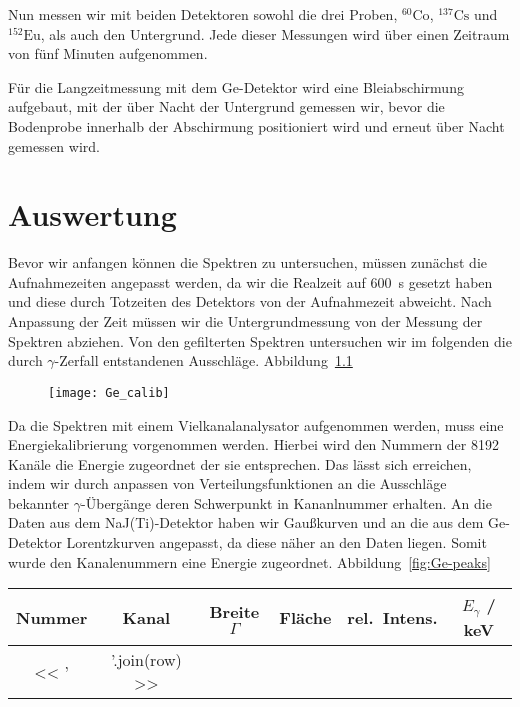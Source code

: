 \documentclass[11pt, ngerman, fleqn, DIV=15, headinclude, BCOR=2cm]{scrreprt}
\newcommand{\plotwidth}{0.8\linewidth}
\begin{document}
Nun messen wir mit beiden Detektoren sowohl die drei Proben, $^{60}\text{Co}$,
$^{137}\text{Cs}$ und $^{152}\text{Eu}$, als auch den Untergrund. Jede dieser
Messungen wird über einen Zeitraum von fünf Minuten aufgenommen.

Für die Langzeitmessung mit dem Ge-Detektor wird eine Bleiabschirmung
aufgebaut, mit der über Nacht der Untergrund gemessen wir, bevor die Bodenprobe
innerhalb der Abschirmung positioniert wird und erneut über Nacht gemessen wird.

\chapter{Auswertung}

Bevor wir anfangen können die Spektren zu untersuchen, müssen zunächst die
Aufnahmezeiten angepasst werden, da wir die Realzeit auf \SI{600}{\second} gesetzt
haben und diese durch Totzeiten des Detektors von der Aufnahmezeit abweicht.
Nach Anpassung der Zeit müssen wir die
Untergrundmessung von der Messung der Spektren abziehen.
Von den gefilterten Spektren untersuchen wir im folgenden die durch
$\gamma$-Zerfall entstandenen Ausschläge. Abbildung~\ref{fig:energiekalibrierung}

\begin{figure}
    \centering
    \texttt{[image: Ge\_calib]}
    \caption{%
    }
    \label{fig:energiekalibrierung}
\end{figure}

Da die Spektren mit einem Vielkanalanalysator aufgenommen werden, muss eine
Energiekalibrierung vorgenommen werden. Hierbei wird den Nummern der 8192
Kanäle die Energie zugeordnet der sie entsprechen.
Das lässt sich erreichen, indem wir durch anpassen von Verteilungsfunktionen an die
Ausschläge bekannter $\gamma$-Übergänge deren Schwerpunkt in Kananlnummer
erhalten. An die Daten aus dem NaJ(Ti)-Detektor haben wir Gaußkurven und an die
aus dem Ge-Detektor Lorentzkurven angepasst, da diese näher an den Daten liegen.
Somit wurde den Kanalenummern eine Energie zugeordnet. Abbildung~\ref{fig:Ge-peaks}

\begin{tabular}{SSSSSS}
    {Nummer} & {Kanal} & {Breite $\Gamma$} & {Fläche} & {rel.\ Intens.} &
    {$E_\gamma$ / \si{\kilo\electronvolt}} \\
    \midrule
    << ' & '.join(row) >> \\
\end{tabular}
\end{document}

